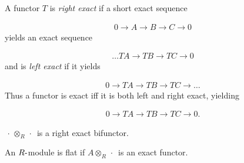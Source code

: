 
\begin{definition}

A functor \(T\) is \emph{right exact} if a short exact sequence

\begin{align*}0 \to A \to B \to C \to 0
\end{align*}
yields an exact sequence

\begin{align*}\ldots TA \to TB \to TC \to 0
\end{align*}
and is \emph{left exact} if it yields

\begin{align*}0 \to TA \to TB \to TC \to \ldots
\end{align*}
Thus a functor is exact iff it is both left and right exact, yielding

\begin{align*}0 \to TA \to TB \to TC \to 0
.\end{align*}

\end{definition}

\begin{example}

\({\,\cdot\,}\otimes_{R} {\,\cdot\,}\) is a right exact bifunctor.

\end{example}

\begin{definition}

\end{definition}


\begin{definition}[Excision]

\end{definition}


\begin{definition}

\end{definition}


\begin{definition}[Flat]

An \(R{\hbox{-}}\)module is flat if \(A\otimes_{R} {\,\cdot\,}\) is an
exact functor.

\end{definition}

